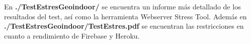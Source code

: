 

En \textbf{./TestEstresGeoindoor/} se encuentra un informe más detallado de los resultados del test, así como la herramienta Webserver Stress Tool. Además en \textbf{./TestEstresGeoindoor/TestEstres.pdf} se encuentran las restricciones en cuanto a rendimiento de Firebase y Heroku.







